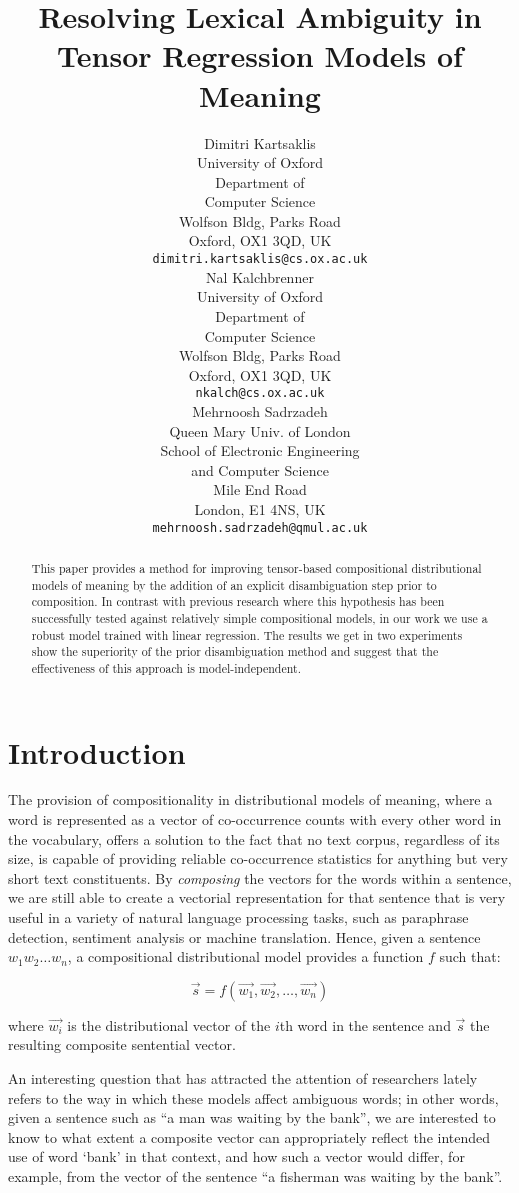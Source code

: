 \documentclass[11pt]{article}
\title{Resolving Lexical Ambiguity in\\Tensor Regression Models of Meaning}
\author{Dimitri Kartsaklis \\
  University of Oxford \\
  Department of \\Computer Science \\
  Wolfson Bldg, Parks Road \\
  Oxford, OX1 3QD, UK \\
  {\tt {\footnotesize dimitri.kartsaklis@cs.ox.ac.uk}} \\\And
  Nal Kalchbrenner \\
  University of Oxford \\
  Department of \\Computer Science \\
  Wolfson Bldg, Parks Road \\
  Oxford, OX1 3QD, UK \\
  {\tt {\footnotesize nkalch@cs.ox.ac.uk}} \\\And
  Mehrnoosh Sadrzadeh \\
  Queen Mary Univ. of London \\
  School of Electronic Engineering \\
  and Computer Science \\
  Mile End Road \\
  London, E1 4NS, UK \\
  {\tt {\footnotesize mehrnoosh.sadrzadeh@qmul.ac.uk}} 
}
\newcommand{\ov}{\overrightarrow}
\begin{document}
\maketitle

\begin{abstract}
This paper provides a method for improving tensor-based compositional distributional models of meaning by the addition of an explicit disambiguation step prior to composition. In contrast with previous research where this hypothesis has been successfully tested against relatively simple compositional models, in our work we use a robust model trained with linear regression. The results we get in two experiments show the superiority of the prior disambiguation method and suggest that the effectiveness of this approach is model-independent.
\end{abstract}

\section{Introduction}
\label{sec:intro}

The provision of compositionality in distributional models of meaning, where a word is represented as a vector of co-occurrence counts with every other word in the vocabulary, offers a solution to the fact that no text corpus, regardless of its size, is capable of providing reliable co-occurrence statistics for anything but very short text constituents. By \textit{composing} the vectors for the words within a  sentence, we are still able to create a vectorial representation for that sentence that is very useful in a variety of natural language processing tasks, such as paraphrase detection, sentiment analysis or machine translation. Hence, given a sentence $w_1w_2 \dots w_n$, a compositional distributional model provides a function $f$ such that:

\vspace{-0.3cm}
\begin{equation}
  \ov{s} = f(\ov{w_1},\ov{w_2},\dots,\ov{w_n})
  \label{equ:comp}
\end{equation}
\vspace{-0.5cm}

\noindent where $\ov{w_i}$ is the distributional vector of the $i$th word in the sentence and $\ov{s}$ the resulting composite sentential vector. 

An interesting question that has attracted the attention of researchers lately refers to the way in which these models affect ambiguous words; in other words, given a sentence such as ``a man was waiting by the bank'', we are interested to know to what extent a composite vector can appropriately reflect the intended use of word `bank' in that context, and how such a vector would differ, for example, from the vector of the sentence ``a fisherman was waiting by the bank''.
\end{document}
